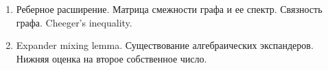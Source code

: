 \begin{enumerate}
    \item Реберное расширение. Матрица смежности графа и ее спектр. Связность графа. Cheeger's inequality.
    \item Expander mixing lemma. Существование алгебраических экспандеров. Нижняя оценка на второе собственное число.
\end{enumerate}
